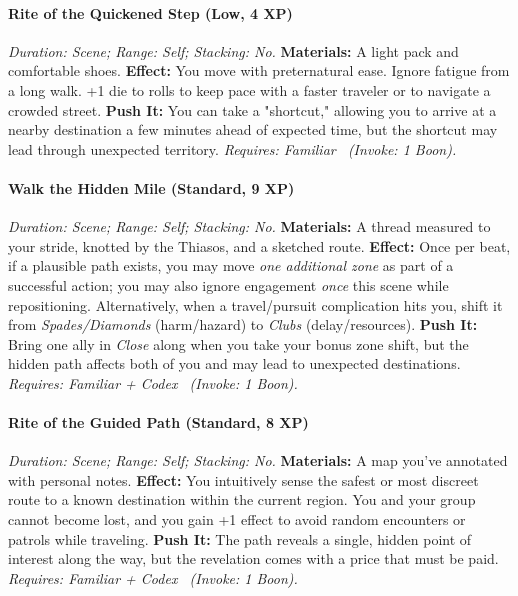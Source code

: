\paragraph{Rite of the Quickened Step (Low, 4 XP)} \emph{Duration: Scene; Range: Self; Stacking: No.}
\textbf{Materials:} A light pack and comfortable shoes.
\textbf{Effect:} You move with preternatural ease. Ignore fatigue from a long walk. +1 die to rolls to keep pace with a faster traveler or to navigate a crowded street.
\textbf{Push It:} You can take a "shortcut," allowing you to arrive at a nearby destination a few minutes ahead of expected time, but the shortcut may lead through unexpected territory.
\emph{Requires: Familiar \ (\textit{Invoke:} 1 Boon).}
\paragraph{Walk the Hidden Mile (Standard, 9 XP)} \emph{Duration: Scene; Range: Self; Stacking: No.}
\textbf{Materials:} A thread measured to your stride, knotted by the Thiasos, and a sketched route.
\textbf{Effect:} Once per beat, if a plausible path exists, you may move \emph{one additional zone} as part of a successful action; you may also ignore engagement \emph{once} this scene while repositioning. Alternatively, when a travel/pursuit complication hits you, shift it from \emph{Spades/Diamonds} (harm/hazard) to \emph{Clubs} (delay/resources).
\textbf{Push It:} Bring one ally in \emph{Close} along when you take your bonus zone shift, but the hidden path affects both of you and may lead to unexpected destinations.
\emph{Requires: Familiar + Codex \ (\textit{Invoke:} 1 Boon).}
\paragraph{Rite of the Guided Path (Standard, 8 XP)} \emph{Duration: Scene; Range: Self; Stacking: No.}
\textbf{Materials:} A map you've annotated with personal notes.
\textbf{Effect:} You intuitively sense the safest or most discreet route to a known destination within the current region. You and your group cannot become lost, and you gain +1 effect to avoid random encounters or patrols while traveling.
\textbf{Push It:} The path reveals a single, hidden point of interest along the way, but the revelation comes with a price that must be paid.
\emph{Requires: Familiar + Codex \ (\textit{Invoke:} 1 Boon).}
